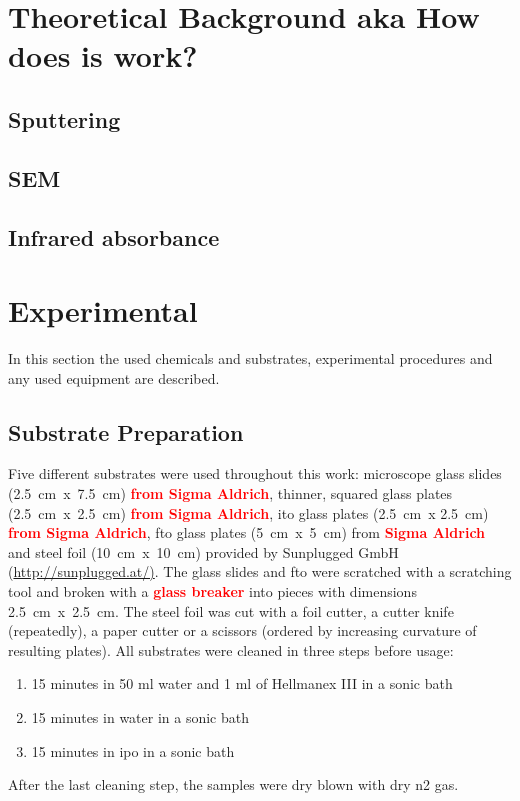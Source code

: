 \documentclass[a4paper]{article}
\newcommand{\td}[1]{\textbf{\textcolor{red}{#1}}}
\newcommand{\ds}[1]{}
\begin{document}
\section{Theoretical Background aka How does is work?}
\subsection{Sputtering}
\subsection{SEM}
\subsection{Infrared absorbance}

\section{Experimental}
\label{sec:exp}
In this section the used chemicals and substrates, experimental procedures and any used equipment are described. 
\subsection{Substrate Preparation}
Five different substrates were used throughout this work: 
microscope glass slides (2.5~cm~x~7.5~cm) \td{from Sigma Aldrich}, thinner, squared glass plates (2.5~cm~x~2.5~cm) \td{from Sigma Aldrich}, \gls{ito} glass plates (2.5~cm~x 2.5~cm) \td{from Sigma Aldrich}, \gls{fto} glass plates (5~cm~x~5~cm) from \td{Sigma Aldrich} and steel foil (10~cm~x~10~cm) provided by Sunplugged GmbH (\url{http://sunplugged.at/)}.
The glass slides and \gls{fto} were \ds{cut\td{/scratched}}scratched with a scratching tool \ds{\td{(diamond scratcher/scraper)} }and broken with a \td{glass breaker} into pieces with dimensions 2.5~cm~x~2.5~cm.
The steel foil was cut with a foil cutter, a cutter knife (repeatedly), a paper cutter or a scissors (ordered by increasing curvature of resulting plates).
All substrates were cleaned in three steps before usage:
\begin{enumerate}
	\item 15 minutes in 50 ml \gls{water} and 1 ml of Hellmanex III in a sonic bath
	\item 15 minutes in \gls{water} in a sonic bath
	\item 15 minutes in \gls{ipo} in a sonic bath 
\end{enumerate}
After the last cleaning step, the samples were dry blown with dry \gls{n2} gas. 
\end{document}
